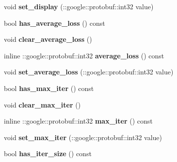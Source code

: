 \begin{DoxyCompactItemize}
void {\bfseries set\+\_\+display} (\+::google\+::protobuf\+::int32 value)
\item 
\mbox{\label{classcaffe_1_1_solver_parameter_ad965e4d793d7cf1116a3293317879333}} 
bool {\bfseries has\+\_\+average\+\_\+loss} () const
\item 
\mbox{\label{classcaffe_1_1_solver_parameter_afe7b2ec09bfc8949b9d0724a91d9443f}} 
void {\bfseries clear\+\_\+average\+\_\+loss} ()
\item 
\mbox{\label{classcaffe_1_1_solver_parameter_a05beed488ece28d331ffe4647e4b3799}} 
inline \+::google\+::protobuf\+::int32 {\bfseries average\+\_\+loss} () const
\item 
\mbox{\label{classcaffe_1_1_solver_parameter_a30df114f16ec1c9438630f99b715e755}} 
void {\bfseries set\+\_\+average\+\_\+loss} (\+::google\+::protobuf\+::int32 value)
\item 
\mbox{\label{classcaffe_1_1_solver_parameter_a2695eeeb06cb1f9904c45465fbf5e5af}} 
bool {\bfseries has\+\_\+max\+\_\+iter} () const
\item 
\mbox{\label{classcaffe_1_1_solver_parameter_a784f1876417151deeeb831e89725ec49}} 
void {\bfseries clear\+\_\+max\+\_\+iter} ()
\item 
\mbox{\label{classcaffe_1_1_solver_parameter_ac4a6ccd7acf0cba591c57a51d213554e}} 
inline \+::google\+::protobuf\+::int32 {\bfseries max\+\_\+iter} () const
\item 
\mbox{\label{classcaffe_1_1_solver_parameter_ac6b2d3ebe8bc4d7a751c8175fb51df66}} 
void {\bfseries set\+\_\+max\+\_\+iter} (\+::google\+::protobuf\+::int32 value)
\item 
\mbox{\label{classcaffe_1_1_solver_parameter_ac2bdd53240d708d4c8374db3d58e3cd7}} 
bool {\bfseries has\+\_\+iter\+\_\+size} () const
\item 
\mbox{\label{classcaffe_1_1_solver_parameter_a1fb001bda682ee81a56d45f73cd3b15a}} 

\end{DoxyCompactItemize}
